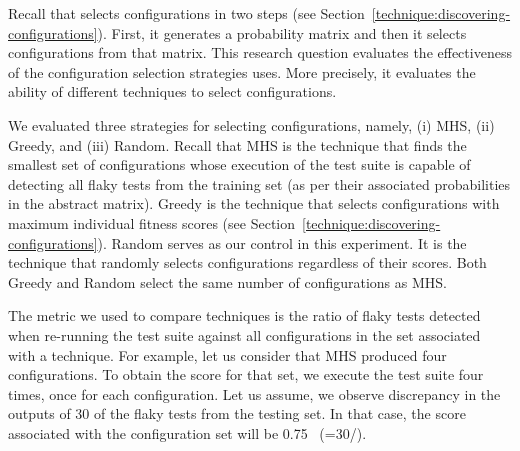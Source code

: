 \documentclass[conference]{IEEEtran}
\begin{document}
Recall that \tname{} selects configurations in two steps (see Section~\ref{technique:discovering-configurations}). First, it generates a probability matrix and then it selects configurations from that matrix. This research question evaluates the effectiveness of the configuration selection strategies \tname{} uses. More precisely, it evaluates the ability of different techniques to select configurations. 

We evaluated three strategies for selecting configurations, namely, (i) MHS, (ii) Greedy, and (iii) Random. Recall that MHS is the technique that finds the smallest set of configurations whose execution of the test suite is capable of detecting all flaky tests from the training set (as per their associated probabilities in the abstract matrix). Greedy is the technique that selects configurations with maximum individual fitness scores (see Section~\ref{technique:discovering-configurations}). Random serves as our control in this experiment. It is the technique that randomly selects configurations regardless of their scores. Both Greedy and Random select the same number of configurations as MHS. 


The metric we used to compare techniques is the ratio of flaky tests detected when re-running the test suite against all configurations in the set associated with a technique. For example, let us consider that MHS produced four configurations. To obtain the score for that set, we execute the test suite four times, once for each configuration. Let us assume, we observe discrepancy in the outputs of 30 of the \numflakytesting{} flaky tests from the testing set. In that case, the score associated with the configuration set will be 0.75
~(=30/\numflakytesting{}). 



\end{document}
